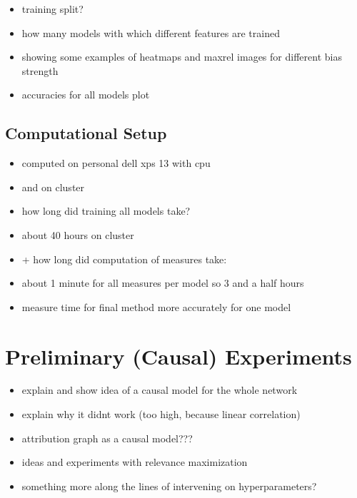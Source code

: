 

\begin{itemize}
    \item training split?
    \item how many models with which different features are trained
    \item showing some examples of heatmaps and maxrel images for different bias strength
    \item accuracies for all models plot
\end{itemize}

\subsection{Computational Setup}
\label{section:setup}
\begin{itemize}
    \item computed on personal dell xps 13 with cpu
    \item and on cluster 
    \item how long did training all models take?
    \item about 40 hours on cluster
    \item + how long did computation of measures take:
    \item about 1 minute for all measures per model so 3 and a half hours
    \item measure time for final method more accurately for one model 
\end{itemize}

\section{Preliminary (Causal) Experiments} 
\begin{itemize}
    \item explain and show idea of a causal model for the whole network
    \item explain why it didnt work (too high, because linear correlation)
    \item attribution graph as a causal model???
    \item ideas and experiments with relevance maximization
    \item something more along the lines of intervening on hyperparameters? \cite{Karimi2023}
\end{itemize}

